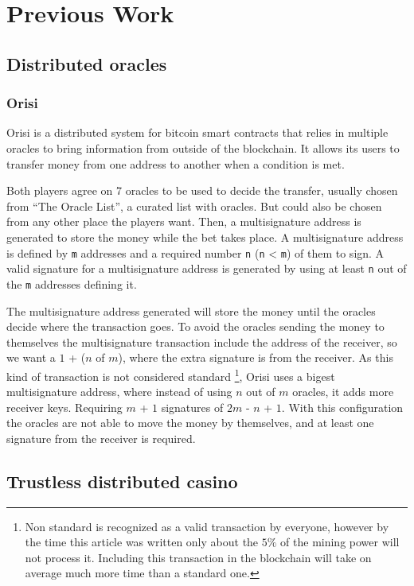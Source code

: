 \section{Previous Work}

\subsection{Distributed oracles}

\subsubsection{Orisi}
Orisi\cite{orisiwhitepaper} is a distributed system for bitcoin smart
  contracts that relies in multiple oracles to bring information from outside
  of the blockchain.
It allows its users to transfer money from one address to another when a
  condition is met.

Both players agree on 7 oracles to be used to decide the transfer, usually
  chosen from ``The Oracle List'', a curated list with oracles. But could also
  be chosen from any other place the players want. Then, a multisignature
  address is generated to store the money while the bet takes place.
A multisignature address is defined by \texttt{m} addresses and a required
  number \texttt{n} (\texttt{n} < \texttt{m}) of them to sign. A valid
  signature for a multisignature address is generated by using at least
  \texttt{n} out of the \texttt{m} addresses defining it.

The multisignature address generated will store the money until the oracles
  decide where the transaction goes. To avoid the oracles sending the money
  to themselves the multisignature transaction include the address of the
  receiver, so we want a $1$ + ($n$ of $m$), where the extra signature is
  from the receiver. As this kind of transaction is not considered standard
  \footnote{Non standard is recognized as a valid transaction by everyone,
  however by the time this article was written only about the $5\%$ of the
  mining power will not process it. Including this transaction in the
  blockchain will take on average much more time than a standard one.},
  Orisi uses a bigest multisignature address, where instead of using
  $n$ out of $m$ oracles, it adds more receiver keys. Requiring $m$ + $1$
  signatures of $2m$ - $n$ + $1$. With this configuration the oracles are
  not able to move the money by themselves, and at least one signature
  from the receiver is required.

\subsection{Trustless distributed casino}

